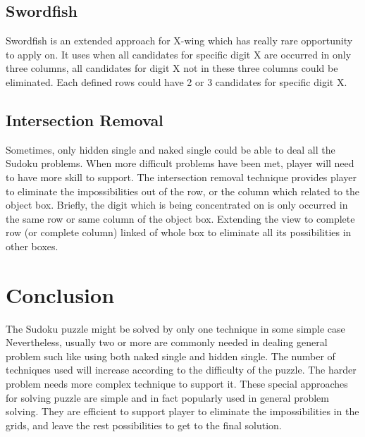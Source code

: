 \documentclass[11pt]{report}
\begin{document}
\section{Swordfish}
\label{sec:Swordfish}
Swordfish is an extended approach for X-wing which has really rare opportunity to apply on. It uses when all candidates for specific digit X are occurred in only three columns, all candidates for digit X not in these three columns could be eliminated. Each defined rows could have 2 or 3 candidates for specific digit X.

\section{Intersection Removal}
\label{sec:Intersection Removal}
Sometimes, only hidden single and naked single could be able to deal all the Sudoku problems. When more difficult problems have been met, player will need to have more skill to support.
The intersection removal technique provides player to eliminate the impossibilities out of the row, or the column which related to the object box.
Briefly, the digit which is being concentrated on is only occurred in the same row or same column of the object box. Extending the view to complete row (or complete column) linked of whole box to eliminate all its possibilities in other boxes.




\chapter{Conclusion}
\label{sec:Conclusion}
The Sudoku puzzle might be solved by only one technique in some simple case Nevertheless, usually two or more are commonly needed in dealing general problem such like using both naked single and hidden single. The number of techniques used will increase according to the difficulty of the puzzle. The harder problem needs more complex technique to support it.
These special approaches for solving puzzle are simple and in fact popularly used in general problem solving. They are efficient to support player to eliminate the impossibilities in the grids, and leave the rest possibilities to get to the final solution.





\end{document}
